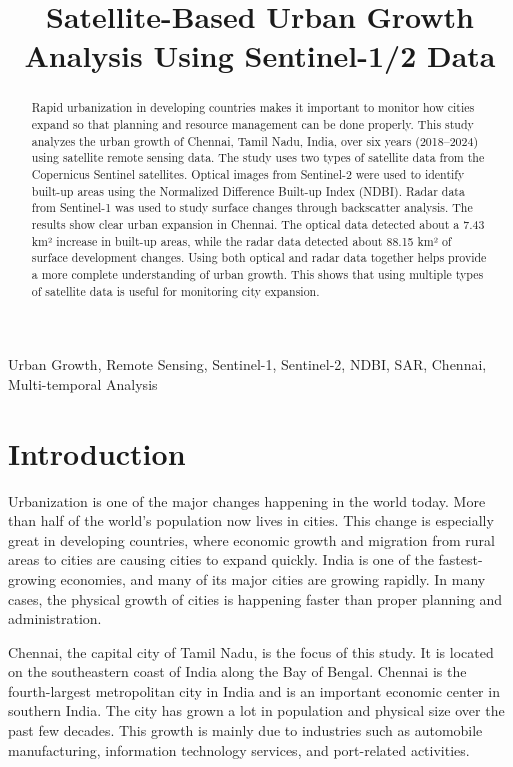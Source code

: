 \documentclass[conference]{IEEEtran}
\begin{document}
\title{Satellite-Based Urban Growth Analysis Using Sentinel-1/2 Data}

\maketitle

\begin{abstract}
Rapid urbanization in developing countries makes it important to monitor how cities expand so that planning and resource management can be done properly. This study analyzes the urban growth of Chennai, Tamil Nadu, India, over six years (2018–2024) using satellite remote sensing data. The study uses two types of satellite data from the Copernicus Sentinel satellites. Optical images from Sentinel-2 were used to identify built-up areas using the Normalized Difference Built-up Index (NDBI). Radar data from Sentinel-1 was used to study surface changes through backscatter analysis. The results show clear urban expansion in Chennai. The optical data detected about a 7.43 km² increase in built-up areas, while the radar data detected about 88.15 km² of surface development changes. Using both optical and radar data together helps provide a more complete understanding of urban growth. This shows that using multiple types of satellite data is useful for monitoring city expansion.

\end{abstract}

\begin{IEEEkeywords}
Urban Growth, Remote Sensing, Sentinel-1, Sentinel-2, NDBI, SAR, Chennai, Multi-temporal Analysis
\end{IEEEkeywords}

\section{Introduction}

Urbanization is one of the major changes happening in the world today. More than half of the world’s population now lives in cities. This change is especially great in developing countries, where economic growth and migration from rural areas to cities are causing cities to expand quickly. India is one of the fastest-growing economies, and many of its major cities are growing rapidly. In many cases, the physical growth of cities is happening faster than proper planning and administration.

Chennai, the capital city of Tamil Nadu, is the focus of this study. It is located on the southeastern coast of India along the Bay of Bengal. Chennai is the fourth-largest metropolitan city in India and is an important economic center in southern India. The city has grown a lot in population and physical size over the past few decades. This growth is mainly due to industries such as automobile manufacturing, information technology services, and port-related activities.
\end{document}
